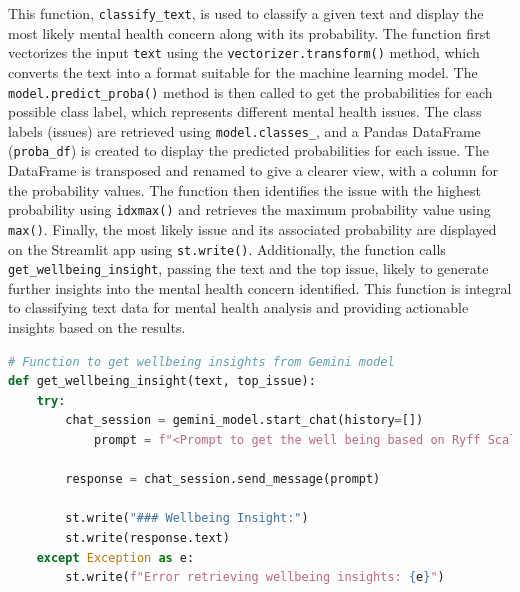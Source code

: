\noindent
This function, \texttt{classify\_text}, is used to classify a given text and display the most likely mental health concern along with its probability. The function first vectorizes the input \texttt{text} using the \texttt{vectorizer.transform()} method, which converts the text into a format suitable for the machine learning model. The \texttt{model.predict\_proba()} method is then called to get the probabilities for each possible class label, which represents different mental health issues. The class labels (issues) are retrieved using \texttt{model.classes\_}, and a Pandas DataFrame (\texttt{proba\_df}) is created to display the predicted probabilities for each issue. The DataFrame is transposed and renamed to give a clearer view, with a column for the probability values. The function then identifies the issue with the highest probability using \texttt{idxmax()} and retrieves the maximum probability value using \texttt{max()}. Finally, the most likely issue and its associated probability are displayed on the Streamlit app using \texttt{st.write()}. Additionally, the function calls \texttt{get\_wellbeing\_insight}, passing the text and the top issue, likely to generate further insights into the mental health concern identified. This function is integral to classifying text data for mental health analysis and providing actionable insights based on the results.


\begin{tcolorbox}[colback=gray!5!white, colframe=gray!80!black, boxrule=0.5pt, title=Getting Wellbeing Insights from Gemini Model]
    \begin{lstlisting}[language=Python]
# Function to get wellbeing insights from Gemini model
def get_wellbeing_insight(text, top_issue):
    try:
        chat_session = gemini_model.start_chat(history=[])
            prompt = f"<Prompt to get the well being based on Ryff Scale Six Factor Model>"

        response = chat_session.send_message(prompt)

        st.write("### Wellbeing Insight:")
        st.write(response.text)
    except Exception as e:
        st.write(f"Error retrieving wellbeing insights: {e}")
    \end{lstlisting}
\end{tcolorbox}

